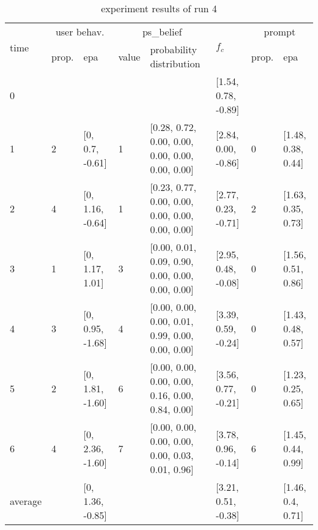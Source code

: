 \begin{table}[htbp]\footnotesize
\caption{experiment results of run 4}
\begin{center}
\begin{tabular}{|p{0.4cm}|p{0.6cm}|l|p{0.6cm}|p{3.3cm}|l|p{0.6cm}|l|}
\hline

\multirow{2}{*}{time} & \multicolumn{2}{c|}{user behav.} & \multicolumn{2}{c|}{ps\_belief} &
\multirow{2}{*}{$f_c$} & \multicolumn{2}{c|}{prompt} \\ \cline{2-5}\cline{ 7- 8}
& prop. & epa & value & probability distribution &  & prop. & epa \\ \hline

0 & \multicolumn{1}{l|}{} &  & \multicolumn{1}{l|}{} &  & [1.54, 0.78, -0.89] & \multicolumn{1}{l|}{} &  \\ \hline
1 & 2 & [0, 0.7, -0.61] & 1 & [0.28, 0.72, 0.00, 0.00, 0.00, 0.00, 0.00, 0.00] & [2.84, 0.00, -0.86] & 0 & [1.48, 0.38, 0.44] \\ \hline
2 & 4 & [0, 1.16, -0.64] & 1 & [0.23, 0.77, 0.00, 0.00, 0.00, 0.00, 0.00, 0.00] & [2.77, 0.23, -0.71] & 2 & [1.63, 0.35, 0.73] \\ \hline
3 & 1 & [0, 1.17, 1.01] & 3 & [0.00, 0.01, 0.09, 0.90, 0.00, 0.00, 0.00, 0.00] & [2.95, 0.48, -0.08] & 0 & [1.56, 0.51, 0.86] \\ \hline
4 & 3 & [0, 0.95, -1.68] & 4 & [0.00, 0.00, 0.00, 0.01, 0.99, 0.00, 0.00, 0.00] & [3.39, 0.59, -0.24] & 0 & [1.43, 0.48, 0.57] \\ \hline
5 & 2 & [0, 1.81, -1.60] & 6 & [0.00, 0.00, 0.00, 0.00, 0.16, 0.00, 0.84, 0.00] & [3.56, 0.77, -0.21] & 0 & [1.23, 0.25, 0.65] \\ \hline
6 & 4 & [0, 2.36, -1.60] & 7 & [0.00, 0.00, 0.00, 0.00, 0.00, 0.03, 0.01, 0.96] & [3.78, 0.96, -0.14] & 6 & [1.45, 0.44, 0.99] \\ \hline
\multicolumn{1}{|l|}{average} & \multicolumn{1}{l|}{} & [0, 1.36, -0.85] & \multicolumn{1}{l|}{} &  & [3.21, 0.51, -0.38] & \multicolumn{1}{l|}{} & [1.46, 0.4, 0.71] \\ \hline
\end{tabular}
\end{center}
\label{}
\end{table}


